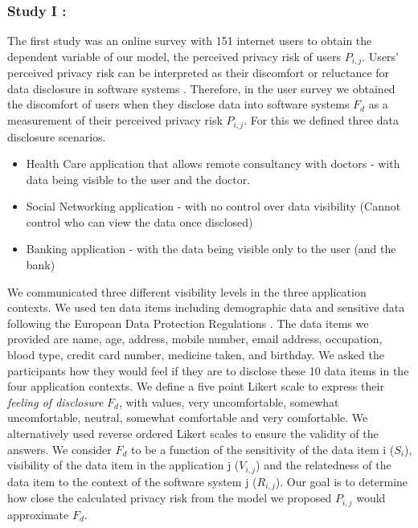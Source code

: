\documentclass[10pt]{article}
\begin{document}
\subsubsection {Study I : }

The first study was an online survey with 151 internet users to obtain the dependent variable of our model, the perceived privacy risk of users $P_{i,j}$. Users' perceived privacy risk can be interpreted as their discomfort or reluctance for data disclosure in software systems \cite {kobsa2007privacy, li2010understanding, malhotra2004internet}. Therefore, in the user survey we obtained the discomfort of users when they disclose data into software systems $F_d$ as a measurement of their perceived privacy risk $P_{i,j}$. For this we defined three data disclosure scenarios.
\begin{itemize}
\item Health Care application that allows remote consultancy with doctors - with data being visible to the user and the doctor.
\item Social Networking application - with no control over data visibility (Cannot control who can view the data once disclosed)
\item Banking application - with the data being visible only to the user (and the bank)
\end{itemize}

We communicated three different visibility levels in the three application contexts. We used ten data items including demographic data and sensitive data following the European Data Protection Regulations \cite {wagner2016national}. The data items we provided are name, age, address, mobile number, email address, occupation, blood type, credit card number, medicine taken, and birthday. We asked the participants how they would feel if they are to disclose these 10 data items in the four application contexts. We define a five point Likert scale to express their \textit{feeling of disclosure} $F_d$, with values, very uncomfortable, somewhat uncomfortable, neutral, somewhat comfortable and very comfortable. We alternatively used reverse ordered Likert scales to ensure the validity of the answers. We consider $F_d$ to be a function of the sensitivity of the data item i ($S_i$), visibility of the data item in the application j ($V_{i,j}$) and the relatedness of the data item to the context of the software system j ($R_{i,j}$). Our goal is to determine how close the calculated privacy risk from the model we proposed $P_{i,j}$ would approximate $F_d$.
\end{document}

